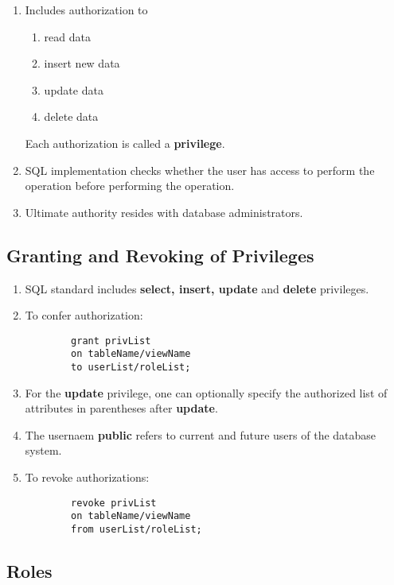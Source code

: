 \documentclass[journal,12pt,twocolumn]{IEEEtran}
\begin{document}
\begin{enumerate}
    \item Includes authorization to 
    \begin{enumerate}
        \item read data
        \item insert new data
        \item update data
        \item delete data
    \end{enumerate}
    Each authorization is called a \textbf{privilege}.
    \item SQL implementation checks whether the user has access to perform the 
    operation before performing the operation.
    \item Ultimate authority resides with database administrators.
\end{enumerate}

\subsection{Granting and Revoking of Privileges}

\begin{enumerate}
    \item SQL standard includes \textbf{select, insert, update} and 
    \textbf{delete} privileges.
    \item To confer authorization:
    \begin{lstlisting}
        grant privList
        on tableName/viewName
        to userList/roleList;
    \end{lstlisting}
    \item For the \textbf{update} privilege, one can optionally specify the authorized
    list of attributes in parentheses after \textbf{update}.
    \item The usernaem \textbf{public} refers to current and future users of
    the database system.
    \item To revoke authorizations:
    \begin{lstlisting}
        revoke privList
        on tableName/viewName
        from userList/roleList;
    \end{lstlisting}
\end{enumerate}

\subsection{Roles}
\end{document}

